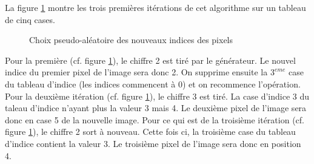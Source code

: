 \documentclass[a4paper]{article}
\begin{document}
        La figure \ref{fig:cipher} montre les trois premières itérations de cet algorithme sur un tableau de cinq cases.

        \begin{figure}[htbp]
            \begin{center}
                \caption{Choix pseudo-aléatoire des nouveaux indices des pixels}
                \label{fig:cipher}
            \end{center}
        \end{figure}

        Pour la première (cf. figure \ref{fig:cipher}), le chiffre 2 est tiré par le générateur. Le nouvel indice du premier pixel de l'image sera donc 2. On supprime ensuite la $3^{eme}$ case du tableau d'indice (les indices commencent  à 0) et on recommence l'opération.
        Pour la deuxième itération (cf. figure \ref{fig:cipher}), le chiffre 3 est tiré. La case d'indice 3 du taleau d'indice n'ayant plus la valeur 3 mais 4. Le deuxième pixel de l'image sera donc en case 5 de la nouvelle image.
        Pour ce qui est de la troisième itération (cf. figure \ref{fig:cipher}), le chiffre 2 sort à nouveau. Cette fois ci, la troisième case du tableau d'indice contient la valeur 3. Le troisième pixel de l'image sera donc en position 4.
\end{document}
